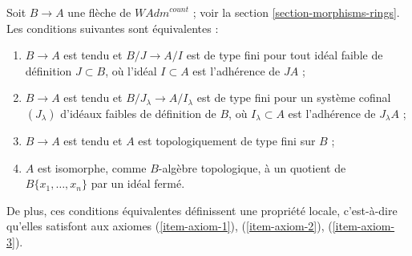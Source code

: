 \begin{lemma}
\label{lemma-quotient-restricted-power-series}
Soit $B \to A$ une flèche de $\textit{WAdm}^{count}$ ; voir la
section \ref{section-morphisms-rings}.
Les conditions suivantes sont équivalentes :
\begin{enumerate}
\item[(a)] $B \to A$ est tendu et $B/J \to A/I$ est de type fini pour
tout idéal faible de définition $J \subset B$, où l'idéal $I \subset A$ est
l'adhérence de $JA$ ;
\item[(b)] $B \to A$ est tendu et $B/J_\lambda \to A/I_\lambda$
est de type fini pour un système cofinal $(J_\lambda)$
d'idéaux faibles de définition de $B$, où
$I_\lambda \subset A$ est l'adhérence de $J_\lambda A$ ;
\item[(c)] $B \to A$ est tendu et $A$ est topologiquement de type
fini sur $B$ ;
\item[(d)] $A$ est isomorphe, comme $B$-algèbre topologique, à un quotient de
$B\{x_1, \ldots, x_n\}$ par un idéal fermé.
\end{enumerate}
De plus, ces conditions équivalentes définissent une propriété locale,
c'est-à-dire qu'elles satisfont aux
axiomes (\ref{item-axiom-1}), (\ref{item-axiom-2}), (\ref{item-axiom-3}).
\end{lemma}

